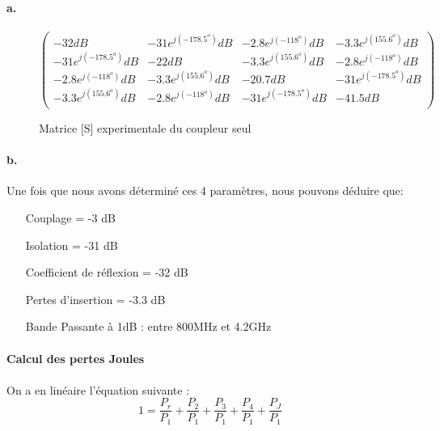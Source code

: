 \documentclass[oneside,a4paper,12pt]{article}
\begin{document}
	\paragraph{a.}\paragraph{}
	\begin{figure}[h]
		\centering
		$
		\begin{pmatrix}
			-32 dB & -31 e^{j(-178.5^{o})} dB & -2.8 e^{j(-118^{o})} dB & -3.3 e^{j(155.6^{o})} dB \\
			-31 e^{j(-178.5^{o})} dB & -22 dB & -3.3 e^{j(155.6^{o})} dB & -2.8 e^{j(-118^{o})} dB \\
			-2.8 e^{j(-118^{o})} dB & -3.3 e^{j(155.6^{o})} dB & -20.7 dB & -31 e^{j(-178.5^{o})} dB \\
			-3.3 e^{j(155.6^{o})} dB & -2.8 e^{j(-118^{o})} dB & -31 e^{j(-178.5^{o})} dB & -41.5 dB \\
		\end{pmatrix}
		$
		\caption{Matrice [S] experimentale du coupleur seul}
	\end{figure}

	\paragraph{b.}
	Une fois que nous avons déterminé ces 4 paramètres, nous pouvons déduire que:

	\begin{itemize}
		\item[Couplage] = -3 dB
		\item[Isolation] = -31 dB 
		\item[Coefficient de réflexion] = -32 dB
		\item[Pertes d'insertion] = -3.3 dB  
		\item[Bande Passante à 1dB] : entre 800MHz et 4.2GHz 
	\end{itemize}
	
	\paragraph{Calcul des pertes Joules}
	\paragraph{}
	On a en linéaire l'équation suivante : 
	\[ 1 = \frac{P_{r}}{P_{1}} + \frac{P_{2}}{P_{1}} + \frac{P_{3}}{P_{1}} + \frac{P_{4}}{P_{1}} + \frac{P_{J}}{P_{1}} \]
\end{document}
